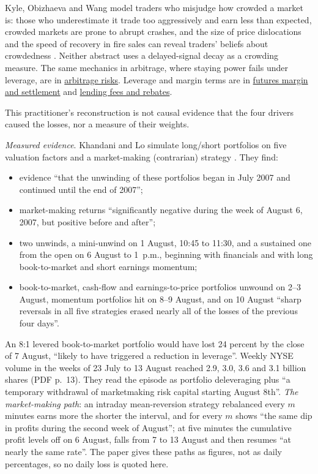 \begin{qfdefinition}
Kyle, Obizhaeva and Wang model traders who misjudge how crowded a market is: those who underestimate it trade too aggressively and earn less than expected, crowded markets are prone to abrupt crashes, and the size of price dislocations and the speed of recovery in fire sales can reveal traders' beliefs about crowdedness \citep[abstract]{w3-kyle-crowded-markets}. Neither abstract uses a delayed-signal decay as a crowding measure. The same mechanics in arbitrage, where staying power fails under leverage, are in \hyperref[res:arbitrage-risks]{arbitrage risks}. Leverage and margin terms are in \hyperref[mech:futures-margin-settlement]{futures margin and settlement} and \hyperref[def:securities-lending-fee-rebate]{lending fees and rebates}.

 This practitioner's reconstruction is not causal evidence that the four drivers caused the losses, nor a measure of their weights.

\emph{Measured evidence}. Khandani and Lo simulate long/short portfolios on five valuation factors and a market-making (contrarian) strategy \citep[NBER WP~14465, November 2008, abstract and sec.~4.3, PDF pp.~2 and~19]{exp-khandani-lo-quant-meltdown}. They find:
\begin{itemize}
\item evidence ``that the unwinding of these portfolios began in July 2007 and continued until the end of 2007'';
\item market-making returns ``significantly negative during the week of August 6, 2007, but positive before and after'';
\item two unwinds, a mini-unwind on 1 August, 10:45 to 11:30, and a sustained one from the open on 6 August to 1~p.m., beginning with financials and with long book-to-market and short earnings momentum;
\item book-to-market, cash-flow and earnings-to-price portfolios unwound on 2--3 August, momentum portfolios hit on 8--9 August, and on 10 August ``sharp reversals in all five strategies erased nearly all of the losses of the previous four days''.
\end{itemize}
An 8:1 levered book-to-market portfolio would have lost 24 percent by the close of 7 August, ``likely to have triggered a reduction in leverage''. Weekly NYSE volume in the weeks of 23 July to 13 August reached 2.9, 3.0, 3.6 and 3.1 billion shares (PDF p.~13). They read the episode as portfolio deleveraging plus ``a temporary withdrawal of marketmaking risk capital starting August 8th''. \emph{The market-making path}: an intraday mean-reversion strategy rebalanced every $m$ minutes earns more the shorter the interval, and for every $m$ shows ``the same dip in profits during the second week of August''; at five minutes the cumulative profit levels off on 6 August, falls from 7 to 13 August and then resumes ``at nearly the same rate''. The paper gives these paths as figures, not as daily percentages, so no daily loss is quoted here.


\end{qfdefinition}
